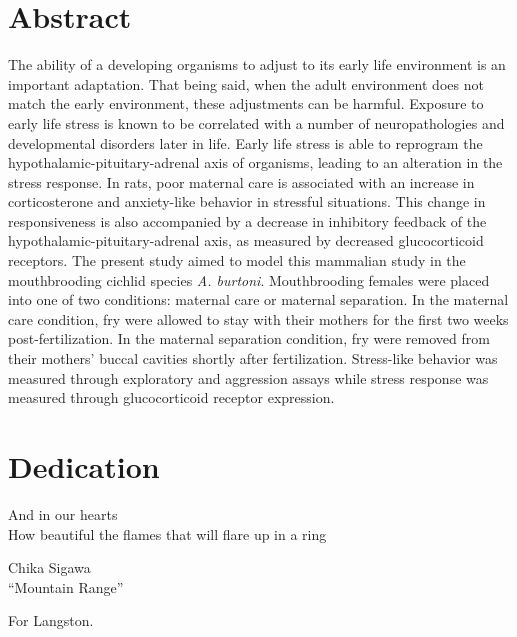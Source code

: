 \documentclass[12pt,twoside]{reedthesis}
\begin{document}
    \tableofcontents
    \listoftables
    \listoffigures

    \chapter*{Abstract}
	The ability of a developing organisms to adjust to its early life environment is an
  important adaptation. That being said, when the adult environment does not
  match the early environment, these adjustments can be harmful. Exposure to
  early life stress is known to be correlated with a number of neuropathologies
  and developmental disorders later in life. Early life stress is able to
  reprogram the hypothalamic-pituitary-adrenal axis of organisms, leading to an
  alteration in the stress response. In rats, poor maternal care is associated
  with an increase in corticosterone and anxiety-like behavior in stressful situations. This change in
  responsiveness is also accompanied by a decrease in inhibitory feedback of the
  hypothalamic-pituitary-adrenal axis, as measured by decreased glucocorticoid
  receptors. The present study aimed to model this mammalian study in the
  mouthbrooding cichlid species \textit{A. burtoni}. Mouthbrooding females were
  placed into one of two conditions: maternal care or maternal separation. In
  the maternal care condition, fry were allowed to stay with their mothers for
  the first two weeks post-fertilization. In the maternal separation condition,
  fry were removed from their mothers' buccal cavities shortly after
  fertilization. Stress-like behavior was measured through exploratory and
  aggression assays while stress response was measured through glucocorticoid
  receptor expression. 
    
	\chapter*{Dedication}
  \epigraph{And in our hearts\\ How beautiful the flames that will flare up in a
    ring}{Chika Sigawa \\ ``Mountain Range''}
For Langston.
  \mainmatter %
  \pagestyle{fancyplain} %

\end{document}
